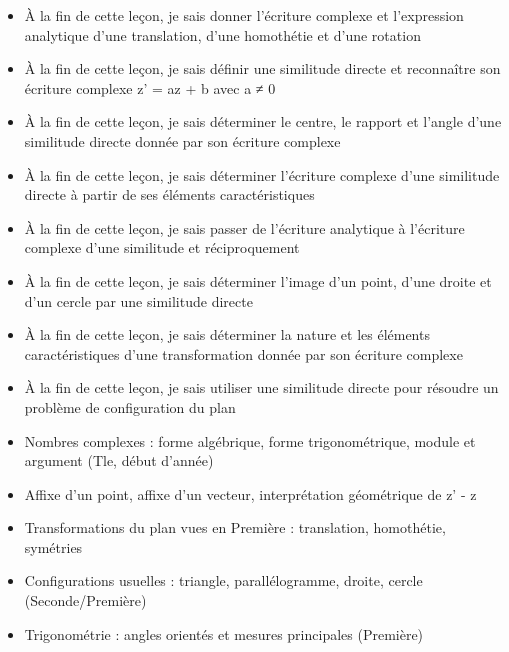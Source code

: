 \documentclass[11pt]{article}
\begin{document}
\begin{objectifs}
\begin{itemize}
\item À la fin de cette leçon, je sais donner l'écriture complexe et l'expression analytique d'une translation, d'une homothétie et d'une rotation
\item À la fin de cette leçon, je sais définir une similitude directe et reconnaître son écriture complexe z' = az + b avec a ≠ 0
\item À la fin de cette leçon, je sais déterminer le centre, le rapport et l'angle d'une similitude directe donnée par son écriture complexe
\item À la fin de cette leçon, je sais déterminer l'écriture complexe d'une similitude directe à partir de ses éléments caractéristiques
\item À la fin de cette leçon, je sais passer de l'écriture analytique à l'écriture complexe d'une similitude et réciproquement
\item À la fin de cette leçon, je sais déterminer l'image d'un point, d'une droite et d'un cercle par une similitude directe
\item À la fin de cette leçon, je sais déterminer la nature et les éléments caractéristiques d'une transformation donnée par son écriture complexe
\item À la fin de cette leçon, je sais utiliser une similitude directe pour résoudre un problème de configuration du plan
\end{itemize}
\end{objectifs}

\begin{prerequis}
\begin{itemize}
\item Nombres complexes : forme algébrique, forme trigonométrique, module et argument (Tle, début d'année)
\item Affixe d'un point, affixe d'un vecteur, interprétation géométrique de z' - z
\item Transformations du plan vues en Première : translation, homothétie, symétries
\item Configurations usuelles : triangle, parallélogramme, droite, cercle (Seconde/Première)
\item Trigonométrie : angles orientés et mesures principales (Première)
\end{itemize}
\end{prerequis}

\newpage
\end{document}
